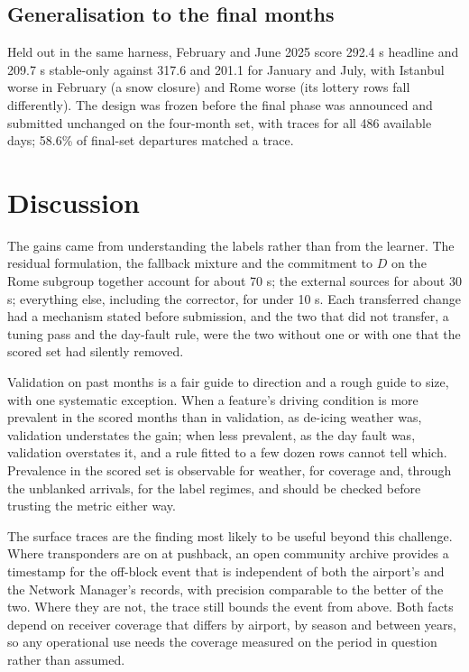 \documentclass[
  manuscript=article,
  layout=preprint,
  year=2027,
  volume=x,
]{extra/joas}
\begin{document}
\subsection{Generalisation to the final months}

Held out in the same harness, February and June 2025 score 292.4 s headline and 209.7 s stable-only against 317.6 and 201.1 for January and July, with Istanbul worse in February (a snow closure) and Rome worse (its lottery rows fall differently). The design was frozen before the final phase was announced and submitted unchanged on the four-month set, with traces for all 486 available days; 58.6\% of final-set departures matched a trace.

\section{Discussion}

The gains came from understanding the labels rather than from the learner. The residual formulation, the fallback mixture and the commitment to $D$ on the Rome subgroup together account for about 70 s; the external sources for about 30 s; everything else, including the corrector, for under 10 s. Each transferred change had a mechanism stated before submission, and the two that did not transfer, a tuning pass and the day-fault rule, were the two without one or with one that the scored set had silently removed.

Validation on past months is a fair guide to direction and a rough guide to size, with one systematic exception. When a feature's driving condition is more prevalent in the scored months than in validation, as de-icing weather was, validation understates the gain; when less prevalent, as the day fault was, validation overstates it, and a rule fitted to a few dozen rows cannot tell which. Prevalence in the scored set is observable for weather, for coverage and, through the unblanked arrivals, for the label regimes, and should be checked before trusting the metric either way.

The surface traces are the finding most likely to be useful beyond this challenge. Where transponders are on at pushback, an open community archive provides a timestamp for the off-block event that is independent of both the airport's and the Network Manager's records, with precision comparable to the better of the two. Where they are not, the trace still bounds the event from above. Both facts depend on receiver coverage that differs by airport, by season and between years, so any operational use needs the coverage measured on the period in question rather than assumed.
\end{document}

